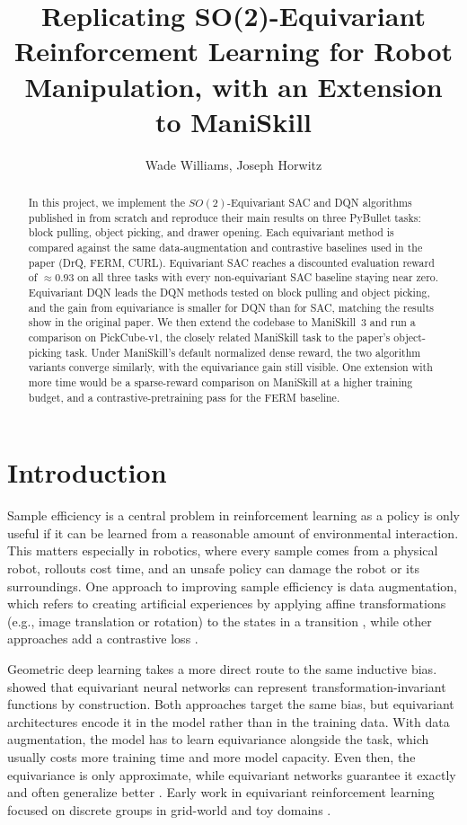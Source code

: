 \documentclass[letterpaper]{article}
\title{Replicating SO(2)-Equivariant Reinforcement Learning for Robot Manipulation, with an Extension to ManiSkill}
\author{
    Wade Williams,
    Joseph Horwitz
}
\begin{document}
\maketitle

\begin{abstract}
In this project, we implement the $SO(2)$-Equivariant SAC and DQN algorithms published in \citet{wang2022so2} from scratch and reproduce their main results on three PyBullet tasks: block pulling, object picking, and drawer opening. Each equivariant method is compared against the same data-augmentation and contrastive baselines used in the paper (DrQ, FERM, CURL). Equivariant SAC reaches a discounted evaluation reward of $\approx 0.93$ on all three tasks with every non-equivariant SAC baseline staying near zero. Equivariant DQN leads the DQN methods tested on block pulling and object picking, and the gain from equivariance is smaller for DQN than for SAC, matching the results show in the original paper. We then extend the codebase to ManiSkill~3 and run a comparison on PickCube-v1, the closely related ManiSkill task to the paper's object-picking task. Under ManiSkill's default normalized dense reward, the two algorithm variants converge similarly, with the equivariance gain still visible. One extension with more time would be a sparse-reward comparison on ManiSkill at a higher training budget, and a contrastive-pretraining pass for the FERM baseline.
\end{abstract}

\section{Introduction}
Sample efficiency is a central problem in reinforcement learning as a policy is only useful if it can be learned from a reasonable amount of environmental interaction. This matters especially in robotics, where every sample comes from a physical robot, rollouts cost time, and an unsafe policy can damage the robot or its surroundings. One approach to improving sample efficiency is data augmentation, which refers to creating artificial experiences by applying affine transformations (e.g., image translation or rotation) to the states in a transition \citep{laskin2020rad,kostrikov2020drq}, while other approaches add a contrastive loss \citep{laskin2020curl,zhan2020ferm}.

Geometric deep learning takes a more direct route to the same inductive bias. \citet{cohen2016gcnn,cohen2016steerable} showed that equivariant neural networks can represent transformation-invariant functions by construction. Both approaches target the same bias, but equivariant architectures encode it in the model rather than in the training data. With data augmentation, the model has to learn equivariance alongside the task, which usually costs more training time and more model capacity. Even then, the equivariance is only approximate, while equivariant networks guarantee it exactly and often generalize better \citep{wang2020symmetry}. Early work in equivariant reinforcement learning focused on discrete groups in grid-world and toy domains \citep{vanderpol2020plannable,vanderpol2020mdp,mondal2020group}.
\end{document}
